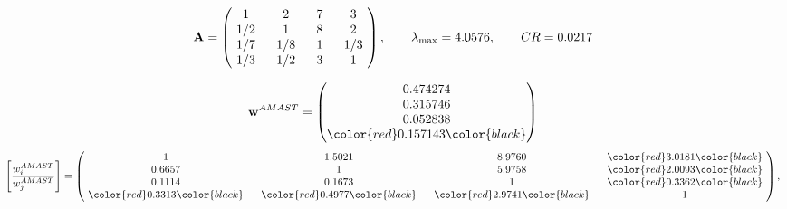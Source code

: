 \begin{example}
\begin{equation*}
\mathbf{A} =
\begin{pmatrix}
$\,\,$ 1 $\,\,$ & $\,\,$2$\,\,$ & $\,\,$7$\,\,$ & $\,\,$3 $\,\,$ \\
$\,\,$ 1/2$\,\,$ & $\,\,$ 1 $\,\,$ & $\,\,$8$\,\,$ & $\,\,$2 $\,\,$ \\
$\,\,$ 1/7$\,\,$ & $\,\,$ 1/8$\,\,$ & $\,\,$ 1 $\,\,$ & $\,\,$ 1/3 $\,\,$ \\
$\,\,$ 1/3$\,\,$ & $\,\,$ 1/2$\,\,$ & $\,\,$3$\,\,$ & $\,\,$ 1  $\,\,$ \\
\end{pmatrix},
\qquad
\lambda_{\max} =
4.0576,
\qquad
CR = 0.0217
\end{equation*}

\begin{equation*}
\mathbf{w}^{AMAST} =
\begin{pmatrix}
0.474274\\
0.315746\\
0.052838\\
\color{red} 0.157143\color{black}
\end{pmatrix}\end{equation*}
\begin{equation*}
\left[ \frac{{w}^{AMAST}_i}{{w}^{AMAST}_j} \right] =
\begin{pmatrix}
$\,\,$ 1 $\,\,$ & $\,\,$1.5021$\,\,$ & $\,\,$8.9760$\,\,$ & $\,\,$\color{red} 3.0181\color{black} $\,\,$ \\
$\,\,$0.6657$\,\,$ & $\,\,$ 1 $\,\,$ & $\,\,$5.9758$\,\,$ & $\,\,$\color{red} 2.0093\color{black}   $\,\,$ \\
$\,\,$0.1114$\,\,$ & $\,\,$0.1673$\,\,$ & $\,\,$ 1 $\,\,$ & $\,\,$\color{red} 0.3362\color{black}  $\,\,$ \\
$\,\,$\color{red} 0.3313\color{black} $\,\,$ & $\,\,$\color{red} 0.4977\color{black} $\,\,$ & $\,\,$\color{red} 2.9741\color{black} $\,\,$ & $\,\,$ 1  $\,\,$ \\
\end{pmatrix},
\end{equation*}


\end{example}
